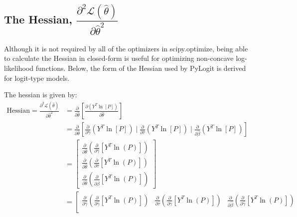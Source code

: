 \documentclass{article}
\begin{document}
\subsection{The Hessian, $\dfrac{\partial ^2 \mathcal{L} \left( \hat{\theta} \right) }{{\partial \hat{\theta}}^2}$}
Although it is not required by all of the optimizers in scipy.optimize, being able to calculate the Hessian in closed-form is useful for optimizing non-concave log-likelihood functions. Below, the form of the Hessian used by PyLogit is derived for logit-type models.

The hessian is given by:
\begin{equation}
\label{eqn:partitioned_hessian}
\begin{aligned}
\textrm{Hessian} = \frac{\partial ^2 \mathcal{L} \left( \hat{\theta} \right) }{ {\partial \hat{\theta}}^2 } &= \frac{\partial}{\partial \hat{\theta}} \left[ \frac{\partial \left( Y^T \ln \left[ P \right] \right) }{\partial \hat{\theta}} \right] \\
&= \frac{\partial}{\partial \hat{\theta}} \left[ \frac{\partial}{\partial \hat{\gamma}}  \left( Y^T \ln \left[ P \right] \right)   \mid \frac{\partial}{\partial \hat{\tau}}  \left( Y^T \ln \left[ P \right] \right) \mid \frac{\partial}{\partial \hat{\beta}}  \left( Y^T \ln \left[ P \right] \right) \right] 
\\
&= \left[ \begin{array}{c}
\frac{\partial}{\partial \hat{\theta}} \left( \frac{\partial}{\partial \hat{\gamma}}  \left[ Y^T \ln \left( P \right) \right] \right)
\\[1.2ex]
\frac{\partial}{\partial \hat{\theta}} \left( \frac{\partial}{\partial \hat{\tau}}  \left[ Y^T \ln \left( P \right) \right] \right) 
\\[1.2ex]
\frac{\partial}{\partial \hat{\theta}} \left( \frac{\partial}{\partial \hat{\beta}} \left[ Y^T \ln \left( P \right) \right] \right)
\end{array}  \right] 
\\
&= \left[ \begin{array}{c|c|c}
\frac{\partial}{\partial \hat{\gamma}}  \left( \frac{\partial}{\partial \hat{\gamma}}  \left[ Y^T \ln \left( P \right) \right] \right)  &

\frac{\partial}{\partial \hat{\tau}}  \left( \frac{\partial}{\partial \hat{\gamma}}  \left[ Y^T \ln \left( P \right) \right] \right) &
 
\frac{\partial}{\partial \hat{\beta}}  \left( \frac{\partial}{\partial \hat{\gamma}}  \left[ Y^T \ln \left( P \right) \right] \right) \\[1.2ex]


\end{array}
\end{aligned}
\end{equation}
\end{document}
